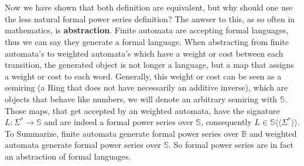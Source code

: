 \documentclass[12pt,letterpaper]{article}
\newcommand{\fps}[1] {
\mathbb{#1}\langle \langle \Sigma^* \rangle \rangle
}
\begin{document}
\\\\
Now we have shown that both definition are equivalent, but why should
one use the less natural formal power series definition? The anwser
to this, as so often in mathematics, is {\bf abstraction}. Finite automata
are accepting formal languages, thus we can say they generate a formal
language. When abstracting from finite automata's to weighted automata's
which have a weight or cost between each transition, the generated
object is not longer a language, but a map that assigns a weight or
cost to each word. Generally, this weight or cost can be seen as a 
semiring (a Ring that does not have necessarily an additive inverse),
which are objects that behave like numbers, we will denote an arbitrary
semiring with $\mathbb{S}$. Those maps, that get accepted by an weighted
automata, have the signature $L: \Sigma^* \to \mathbb{S}$ and are 
indeed a formal power series over $\mathbb{S}$, consequently $L \in \fps{S}$.
To Summarize, finite automata generate formal power series over $\mathbb{B}$
and weighted automata generate formal power series over $\mathbb{S}$. So 
formal power series are in fact an abstraction of formal languages.
\end{document}
